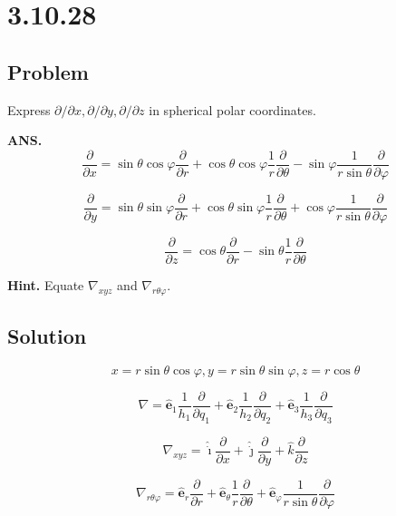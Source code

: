 \documentclass[12pt]{article}
\begin{document}
\section{3.10.28}\label{3.10.28}

\subsection{Problem}

Express \(\partial/\partial x, \partial/\partial y, \partial/\partial z\) in spherical polar coordinates.

\bigskip

\textbf{ANS.}
\[
    \frac{\partial}{\partial x} = \sin{\theta} \cos{\varphi} \frac{\partial}{\partial r}
    + \cos{\theta} \cos{\varphi} \frac{1}{r} \frac{\partial}{\partial \theta}
    - \sin{\varphi} \frac{1}{r \sin{\theta}} \frac{\partial}{\partial \varphi}
\]

\[
    \frac{\partial}{\partial y} = \sin{\theta} \sin{\varphi} \frac{\partial}{\partial r}
    + \cos{\theta} \sin{\varphi} \frac{1}{r} \frac{\partial}{\partial \theta}
    + \cos{\varphi} \frac{1}{r \sin{\theta}} \frac{\partial}{\partial \varphi}
\]

\[
    \frac{\partial}{\partial z} = \cos{\theta} \frac{\partial}{\partial r}
    - \sin{\theta} \frac{1}{r} \frac{\partial}{\partial \theta}
\]

\bigskip

\textbf{Hint.} Equate \(\nabla_{xyz}\) and \(\nabla_{r \theta \varphi }\).

\subsection{Solution}

\[
    x = r \sin{\theta} \cos{\varphi}, y = r \sin{\theta} \sin{\varphi}, z = r \cos{\theta}
\]

\[
    \nabla = \hat{\mathbf{e}}_1 \frac{1}{h_1} \frac{\partial}{\partial q_1}
    + \hat{\mathbf{e}}_2 \frac{1}{h_2} \frac{\partial}{\partial q_2}
    + \hat{\mathbf{e}}_3 \frac{1}{h_3} \frac{\partial}{\partial q_3}
\]

\[
    \nabla_{xyz} =  \hat{\dot{\imath}} \frac{\partial}{\partial x}
    + \hat{\dot{\jmath}} \frac{\partial}{\partial y}
    +  \hat{k} \frac{\partial}{\partial z}
\]

\[
    \nabla_{r \theta \varphi } = \hat{\mathbf{e}}_r \frac{\partial}{\partial r}
    + \hat{\mathbf{e}}_\theta \frac{1}{r} \frac{\partial}{\partial \theta}
    + \hat{\mathbf{e}}_\varphi \frac{1}{r \sin{\theta}} \frac{\partial}{\partial \varphi}
\]
\end{document}
